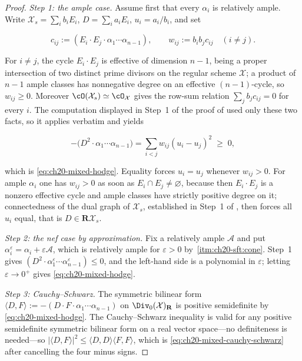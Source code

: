 \begin{proof}
\emph{Step 1: the ample case.}  Assume first that every $\alpha_i$ is
relatively ample.  Write $\mathcal X_s=\sum_ib_iE_i$, $D=\sum_ia_iE_i$,
$u_i=a_i/b_i$, and set

\[
 c_{ij}:=(E_i\cdot E_j\cdot\alpha_1\cdots\alpha_{n-1}),
 \qquad
 w_{ij}:=b_ib_jc_{ij}\quad(i\ne j).
\]

For $i\ne j$, the cycle $E_i\cdot E_j$ is effective of dimension
$n-1$, being a proper intersection of two distinct prime divisors on the
regular scheme $\mathcal X$; a product of $n-1$ ample classes has
nonnegative degree on an effective $(n-1)$-cycle, so $w_{ij}\geq0$.
Moreover $\cO(\mathcal X_s)\simeq\cO_{\mathcal X}$ gives the row-sum
relation $\sum_jb_jc_{ij}=0$ for every $i$.  The computation displayed
in Step~1 of the proof of  used only these two
facts, so it applies verbatim and yields

\begin{equation}
\label{eq:ch20-mixed-hodge-laplacian}
 -\bigl(D^2\cdot\alpha_1\cdots\alpha_{n-1}\bigr)
 =\sum_{i<j}w_{ij}(u_i-u_j)^2\;\geq\;0,
\end{equation}

which is \eqref{eq:ch20-mixed-hodge}.  Equality forces $u_i=u_j$ whenever
$w_{ij}>0$.  For ample $\alpha_i$ one has $w_{ij}>0$ as soon as
$E_i\cap E_j\neq\varnothing$, because then $E_i\cdot E_j$ is a nonzero
effective cycle and ample classes have strictly positive degree on it;
connectedness of the dual graph of $\mathcal X_s$, established in Step~1 of
, then forces all $u_i$ equal, that is
$D\in\mathbf R\mathcal X_s$.

\emph{Step 2: the nef case by approximation.}  Fix a relatively ample
$\mathcal A$ and put $\alpha_i^\varepsilon=\alpha_i+\varepsilon\mathcal A$,
which is relatively ample for $\varepsilon>0$ by
\,\cref{itm:ch20-sft:cone}.  Step~1 gives
$(D^2\cdot\alpha_1^\varepsilon\cdots\alpha_{n-1}^\varepsilon)\leq0$, and
the left-hand side is a polynomial in $\varepsilon$; letting
$\varepsilon\to0^+$ gives \eqref{eq:ch20-mixed-hodge}.

\emph{Step 3: Cauchy--Schwarz.}  The symmetric bilinear form
$\langle D,F\rangle:=-(D\cdot F\cdot\alpha_1\cdots\alpha_{n-1})$ on
$\Div_0(\mathcal X)_{\mathbf R}$ is positive semidefinite by
\eqref{eq:ch20-mixed-hodge}.  The Cauchy--Schwarz inequality is valid for
any positive semidefinite symmetric bilinear form on a real vector space---no
definiteness is needed---so
$|\langle D,F\rangle|^2\leq\langle D,D\rangle\langle F,F\rangle$, which is
\eqref{eq:ch20-mixed-cauchy-schwarz} after cancelling the four minus signs.
\end{proof}

